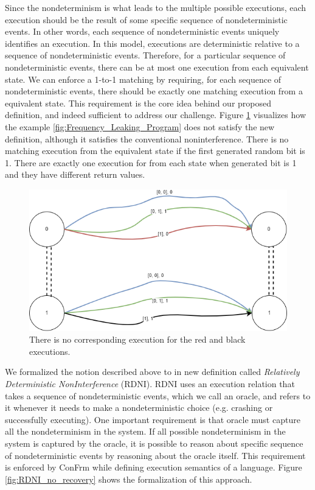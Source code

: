 Since the nondeterminism is what leads to the multiple possible executions, each execution should be the result of some specific sequence of nondeterministic events. In other words, each sequence of nondeterministic events uniquely identifies an execution. In this model, executions are deterministic relative to a sequence of nondeterministic events. Therefore, for a particular sequence of nondeterministic events, there can be at most one execution from each equivalent state. We can enforce a 1-to-1 matching by requiring, for each sequence of nondeterministic events, there should be exactly one matching execution from a equivalent state. 
This requirement is the core idea behind our proposed definition, and indeed sufficient to address our challenge. Figure \ref{fig:RDNI_Matching_Paths} visualizes how the example \ref{fig:Frequency_Leaking_Program} does not satisfy the new definition, although it satisfies the conventional noninterference. There is no matching execution from the equivalent state if the first generated random bit is 1. There are exactly one execution for from each state when generated bit is 1 and they have different return values.

\begin{figure}[h]
    \centering
    \includegraphics[scale=0.5]{templates/figures/matching-paths-rdni.png}
    \caption{There is no corresponding execution for the red and black executions.}
    \label{fig:RDNI_Matching_Paths}
\end{figure}

We formalized the notion described above to in new definition called \emph{Relatively Deterministic NonInterference} (RDNI). RDNI uses an execution relation that takes a sequence of nondeterministic events, which we call an oracle, and refers to it whenever it needs to make a nondeterministic choice (e.g. crashing or successfully executing). One important requirement is that oracle must capture all the nondeterminism in the system. If all possible nondeterminism in the system is captured by the oracle, it is possible to reason about specific sequence of nondeterministic events by reasoning about the oracle itself. This requirement is enforced by ConFrm while defining execution semantics of a language. Figure \ref{fig:RDNI_no_recovery} shows the formalization of this approach.

